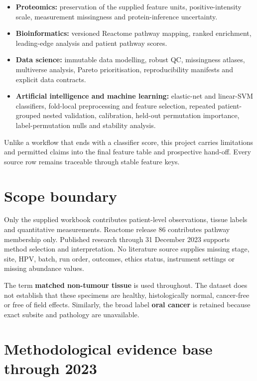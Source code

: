 \begin{itemize}
\item \textbf{Proteomics:} preservation of the supplied feature units, positive-intensity scale, measurement missingness and protein-inference uncertainty.
\item \textbf{Bioinformatics:} versioned Reactome pathway mapping, ranked enrichment, leading-edge analysis and patient pathway scores.
\item \textbf{Data science:} immutable data modelling, robust QC, missingness atlases, multiverse analysis, Pareto prioritisation, reproducibility manifests and explicit data contracts.
\item \textbf{Artificial intelligence and machine learning:} elastic-net and linear-SVM classifiers, fold-local preprocessing and feature selection, repeated patient-grouped nested validation, calibration, held-out permutation importance, label-permutation nulls and stability analysis.
\end{itemize}

Unlike a workflow that ends with a classifier score, this project carries limitations and permitted claims into the final feature table and prospective hand-off. Every source row remains traceable through stable feature keys.

\section{Scope boundary}
\label{sec:scope_boundary}

Only the supplied workbook contributes patient-level observations, tissue labels and quantitative measurements. Reactome release 86 contributes pathway membership only. Published research through 31 December 2023 supports method selection and interpretation. No literature source supplies missing stage, site, HPV, batch, run order, outcomes, ethics status, instrument settings or missing abundance values.

The term \textbf{matched non-tumour tissue} is used throughout. The dataset does not establish that these specimens are healthy, histologically normal, cancer-free or free of field effects. Similarly, the broad label \textbf{oral cancer} is retained because exact subsite and pathology are unavailable.

\section{Methodological evidence base through 2023}
\label{sec:methodological_evidence_base_through_2023}

